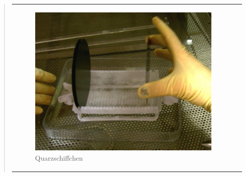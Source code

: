 \begin{quote}
\begin{center}
\begin{tabular}{ll}
                \hspace{-7em}
                    \begin{minipage}{0.5\textwidth}
                        \begin{figure}[H]
                        \hspace{-2em}
                            \includegraphics[scale=0.8, trim = 0cm 0cm 0cm
                            0cm, clip]{./HerstellungBilder/Quarzschiffchen.png}
                            \caption{Quarzschiffchen}
                           \label{fig:quarz}
                        \end{figure}

                    \end{minipage}
                    \begin{minipage}{0.75\textwidth}


\end{minipage}
\end{tabular}
\end{center}
\end{quote}

